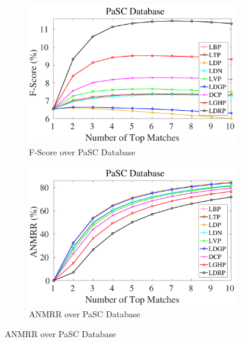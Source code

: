 \documentclass[a4paper]{article}
\begin{document}
\begin{figure}[!t]
\begin{subfigure}{.25\textwidth}
    \includegraphics[width=.98\linewidth]{pasc-f}
    \caption{F-Score over PaSC Database}
    \label{fig:pasc-f}
  \end{subfigure}%
    \begin{subfigure}{.25\textwidth}
    \centering
    \includegraphics[width=.98\linewidth]{pasc-anmrr}
    \caption{ANMRR over PaSC Database}
    \label{fig:pasc-anmrr}
  \end{subfigure}
  \vspace{3mm}
  

\end{figure}
\end{document}
